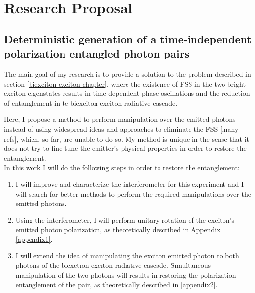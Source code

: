 \section{Research Proposal}
\subsection{Deterministic generation of a time-independent polarization entangled photon pairs}
The main goal of my research is to provide a solution to the problem described in section \ref{biexciton-exciton-chapter}, where the existence of FSS in the two bright exciton eigenstates results in time-dependent phase oscillations and the reduction of entanglement in te biexciton-exciton radiative cascade.
\iffalse
The presence of the splitting in the lowest excitonic state is an unwanted effect in QDs that causes a degradation in the degree of entanglement between the two photons in the biexciton-exciton radiative cascade by lifting the degeneracy of the levels\cite{Winik2017}. This is due to several causes but mainly as a result of the asymmetry of the QD.$\newline$
\fi
Here, I propose a method to perform manipulation over the emitted photons instead of using widespread ideas and approaches to eliminate the FSS [many refs], which, so far, are unable to do so. My method is unique in the sense that it does not try to fine-tune the emitter's physical properties in order to restore the entanglement.\\
In this work I will do the following steps in order to restore the entanglement:
\begin{enumerate}
	\item  I will improve and characterize the interferometer for this experiment and I will search for better methods to perform the required manipulations over the emitted photons. 
	\item Using the interferometer, I will perform unitary rotation of the exciton's emitted photon polarization,  as theoretically described in Appendix \ref{appendix1}.
	\item I will extend the idea of manipulating the exciton emitted photon to both photons of the biexction-exciton radiative cascade. Simultaneous manipulation of the two photons will results in restoring the polarization entanglement of the pair, as theoretically described in \ref{appendix2}.
\end{enumerate} 


